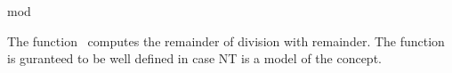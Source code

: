 \begin{ccRefFunction}{mod}

\ccDefinition

The function \ccRefName\ computes the remainder of division with remainder. 
The function is guranteed to be well defined in case NT 
is a model of the  concept. 



\ccSeeAlso

\\
\\
\\
\\

\end{ccRefFunction}